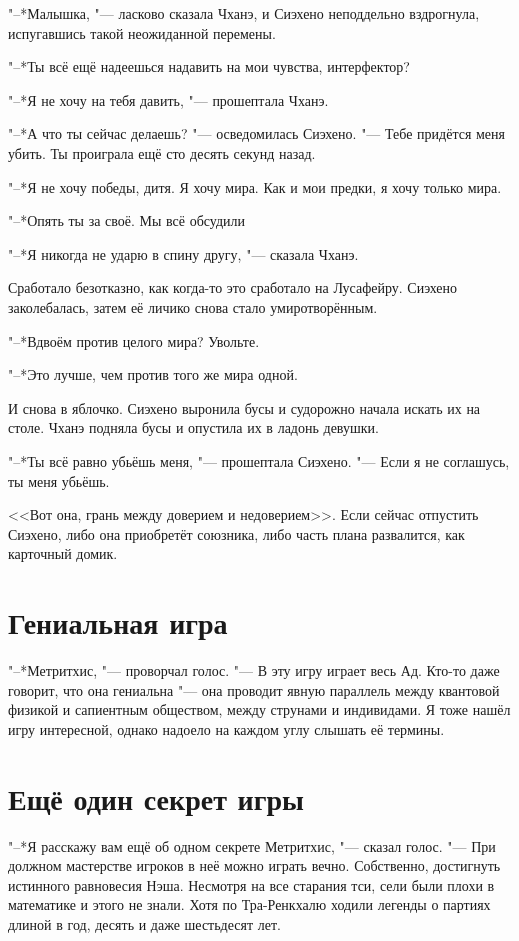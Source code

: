 "--*Малышка, "--- ласково сказала Чханэ, и Сиэхено неподдельно вздрогнула, испугавшись такой неожиданной перемены.

"--*Ты всё ещё надеешься надавить на мои чувства, интерфектор?

"--*Я не хочу на тебя давить, "--- прошептала Чханэ.

"--*А что ты сейчас делаешь? "--- осведомилась Сиэхено.
"--- Тебе придётся меня убить.
Ты проиграла ещё сто десять секунд назад.

"--*Я не хочу победы, дитя.
Я хочу мира.
Как и мои предки, я хочу только мира.

"--*Опять ты за своё.
Мы всё обсудили\ldotst

"--*Я никогда не ударю в спину другу, "--- сказала Чханэ.

Сработало безотказно, как когда-то это сработало на Лусафейру.
Сиэхено заколебалась, затем её личико снова стало умиротворённым.

"--*Вдвоём против целого мира?
Увольте.

"--*Это лучше, чем против того же мира одной.

И снова в яблочко.
Сиэхено выронила бусы и судорожно начала искать их на столе.
Чханэ подняла бусы и опустила их в ладонь девушки.

"--*Ты всё равно убьёшь меня, "--- прошептала Сиэхено.
"--- Если я не соглашусь, ты меня убьёшь.

<<Вот она, грань между доверием и недоверием>>.
Если сейчас отпустить Сиэхено, либо она приобретёт союзника, либо часть плана развалится, как карточный домик.

\section{Гениальная игра}

"--*Метритхис, "--- проворчал голос.
"--- В эту игру играет весь Ад.
Кто-то даже говорит, что она гениальна "--- она проводит явную параллель между квантовой физикой и сапиентным обществом, между струнами и индивидами.
Я тоже нашёл игру интересной, однако надоело на каждом углу слышать её термины.

\section{Ещё один секрет игры}

"--*Я расскажу вам ещё об одном секрете Метритхис, "--- сказал голос.
"--- При должном мастерстве игроков в неё можно играть вечно.
Собственно, достигнуть истинного равновесия Нэша.
Несмотря на все старания тси, сели были плохи в математике и этого не знали.
Хотя по Тра-Ренкхалю ходили легенды о партиях длиной в год, десять и даже шестьдесят лет.

